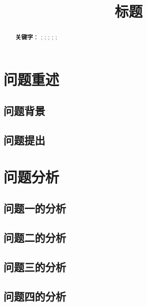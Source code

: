 \documentclass[UTF8]{ctexart}
\title{\textbf{标题}}
\date{} %
\begin{document}
\maketitle{}
\renewcommand{\abstractname}{\Large 摘要\\}   %
\begin{abstract}
	\normalsize
    \fontsize{12pt}{18pt}
	


	\textbf{关键字}： ;  ;  ;  ;  ;   %
\end{abstract}
\thispagestyle{empty}    %
\newpage

\setcounter{page}{1}  %

\section{问题重述}

\subsection{问题背景}


\subsection{问题提出}






\section{问题分析}
\subsection{问题一的分析}




\subsection{问题二的分析}




\subsection{问题三的分析}




\subsection{问题四的分析}
\end{document}

